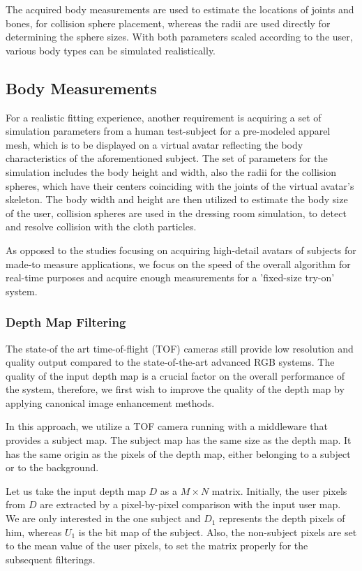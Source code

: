 \documentclass[number,preprint,review,12pt]{elsarticle}
\begin{document}
The acquired body measurements are used to estimate the locations of joints and bones, for collision sphere placement, whereas the radii are used directly for determining the sphere sizes. With both parameters scaled according to the user, various body types can be simulated realistically.

\subsection{Body Measurements}
\label{subsec:Measurements}
For a realistic fitting experience, another requirement is acquiring a set of simulation parameters from a human test-subject for a pre-modeled apparel mesh, which is to be displayed on a virtual avatar reflecting the body characteristics of the aforementioned subject.  The set of parameters for the simulation includes the body height and width, also the radii for the collision spheres, which have their centers coinciding with the joints of the virtual avatar's skeleton.
The body width and height are then utilized to estimate the body size of the user, collision spheres are used in the dressing room simulation, to detect and resolve collision with the cloth particles.

As opposed to the studies focusing on acquiring high-detail avatars of subjects for made-to measure applications, we focus on the speed of the overall algorithm for real-time purposes and acquire enough measurements for a 'fixed-size try-on' system.   
  
\subsubsection{Depth Map Filtering}
\label{subsubsec:4.1} 
The state-of the art time-of-flight (TOF) cameras still provide low resolution and quality output compared to the state-of-the-art advanced RGB systems. The quality of the input depth map is a crucial factor on the overall performance of the system, therefore, we first wish to improve the quality of the depth map by applying canonical image enhancement methods.

In this approach, we utilize a TOF camera running with a middleware that provides a subject map. The subject map has the same size as the depth map. It has the same origin as the pixels of the depth map, either belonging to a subject or to the background.

Let us take the input depth map $D$ as a $M \times N$ matrix. Initially, the user pixels from $D$ are extracted by a pixel-by-pixel comparison with the input user map. We are only interested in the one subject and $D_1$ represents the depth pixels of him, whereas $U_1$ is the bit map of the subject. Also, the non-subject pixels are set to the mean value of the user pixels, to set the matrix properly for the subsequent filterings.
\end{document}
